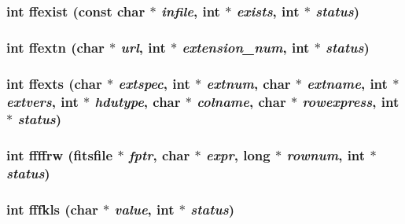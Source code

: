 \subsubsection{\setlength{\rightskip}{0pt plus 5cm}int ffexist (const char $\ast$ {\em infile}, int $\ast$ {\em exists}, int $\ast$ {\em status})}\label{fitsio__64_8h_a43845de368eac56f4640bb78d54fe12}


\subsubsection{\setlength{\rightskip}{0pt plus 5cm}int ffextn (char $\ast$ {\em url}, int $\ast$ {\em extension\_\-num}, int $\ast$ {\em status})}\label{fitsio__64_8h_9dcef60f99afddb050fbcd03fa2c97d9}


\subsubsection{\setlength{\rightskip}{0pt plus 5cm}int ffexts (char $\ast$ {\em extspec}, int $\ast$ {\em extnum}, char $\ast$ {\em extname}, int $\ast$ {\em extvers}, int $\ast$ {\em hdutype}, char $\ast$ {\em colname}, char $\ast$ {\em rowexpress}, int $\ast$ {\em status})}\label{fitsio__64_8h_17f7be49ef6df7e06048b3c9a23d4fd4}


\subsubsection{\setlength{\rightskip}{0pt plus 5cm}int ffffrw (\bf{fitsfile} $\ast$ {\em fptr}, char $\ast$ {\em expr}, long $\ast$ {\em rownum}, int $\ast$ {\em status})}\label{fitsio__64_8h_7e15c97abea56f20a86aa02d71fe80a2}


\subsubsection{\setlength{\rightskip}{0pt plus 5cm}int fffkls (char $\ast$ {\em value}, int $\ast$ {\em status})}\label{fitsio__64_8h_993b8ab9ce591792c355153783b3994a}


